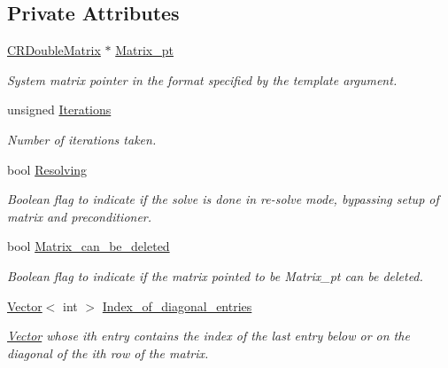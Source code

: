 \subsection*{Private Attributes}
\begin{DoxyCompactItemize}
\item 
\hyperlink{classoomph_1_1CRDoubleMatrix}{C\+R\+Double\+Matrix} $\ast$ \hyperlink{classoomph_1_1GS_3_01CRDoubleMatrix_01_4_aa802bd3307059805f5736859a6876993}{Matrix\+\_\+pt}
\begin{DoxyCompactList}\small\item\em System matrix pointer in the format specified by the template argument. \end{DoxyCompactList}\item 
unsigned \hyperlink{classoomph_1_1GS_3_01CRDoubleMatrix_01_4_a1f8692d02e2ab2ae8be7faf90244c4ff}{Iterations}
\begin{DoxyCompactList}\small\item\em Number of iterations taken. \end{DoxyCompactList}\item 
bool \hyperlink{classoomph_1_1GS_3_01CRDoubleMatrix_01_4_afbe2e9586e313c3a46156ee07ea9fe37}{Resolving}
\begin{DoxyCompactList}\small\item\em Boolean flag to indicate if the solve is done in re-\/solve mode, bypassing setup of matrix and preconditioner. \end{DoxyCompactList}\item 
bool \hyperlink{classoomph_1_1GS_3_01CRDoubleMatrix_01_4_a832e1f37f8a3b83ed95bb5feea0ba92c}{Matrix\+\_\+can\+\_\+be\+\_\+deleted}
\begin{DoxyCompactList}\small\item\em Boolean flag to indicate if the matrix pointed to be Matrix\+\_\+pt can be deleted. \end{DoxyCompactList}\item 
\hyperlink{classoomph_1_1Vector}{Vector}$<$ int $>$ \hyperlink{classoomph_1_1GS_3_01CRDoubleMatrix_01_4_adb2dfc358598fe4492b4f6ac5c3371c2}{Index\+\_\+of\+\_\+diagonal\+\_\+entries}
\begin{DoxyCompactList}\small\item\em \hyperlink{classoomph_1_1Vector}{Vector} whose i\textquotesingle{}th entry contains the index of the last entry below or on the diagonal of the i\textquotesingle{}th row of the matrix. \end{DoxyCompactList}\end{DoxyCompactItemize}
